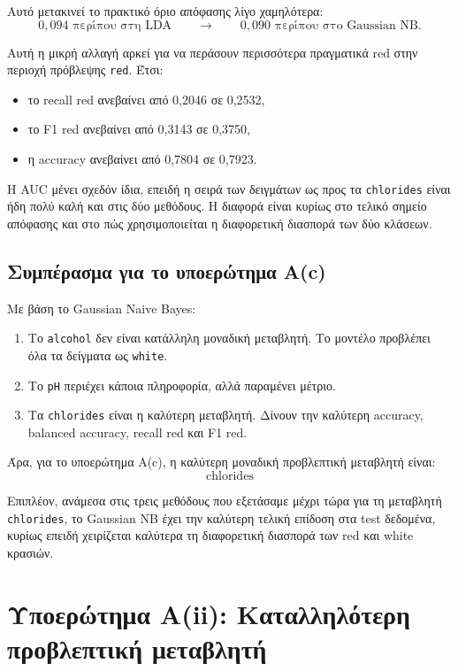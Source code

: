 \documentclass[11pt,a4paper]{article}
\newcommand{\code}[1]{\texttt{#1}}
\begin{document}
Αυτό μετακινεί το πρακτικό όριο απόφασης λίγο χαμηλότερα:
\[
0{,}094 \text{ περίπου στη LDA}
\qquad \rightarrow \qquad
0{,}090 \text{ περίπου στο Gaussian NB}.
\]

Αυτή η μικρή αλλαγή αρκεί για να περάσουν περισσότερα πραγματικά red στην
περιοχή πρόβλεψης \code{red}. Έτσι:
\begin{itemize}
    \item το recall red ανεβαίνει από 0,2046 σε 0,2532,
    \item το F1 red ανεβαίνει από 0,3143 σε 0,3750,
    \item η accuracy ανεβαίνει από 0,7804 σε 0,7923.
\end{itemize}

Η AUC μένει σχεδόν ίδια, επειδή η σειρά των δειγμάτων ως προς τα
\code{chlorides} είναι ήδη πολύ καλή και στις δύο μεθόδους. Η διαφορά είναι
κυρίως στο τελικό σημείο απόφασης και στο πώς χρησιμοποιείται η διαφορετική
διασπορά των δύο κλάσεων.

\subsection{Συμπέρασμα για το υποερώτημα Α(c)}

Με βάση το Gaussian Naive Bayes:
\begin{enumerate}
    \item Το \code{alcohol} δεν είναι κατάλληλη μοναδική μεταβλητή. Το μοντέλο
    προβλέπει όλα τα δείγματα ως \code{white}.

    \item Το \code{pH} περιέχει κάποια πληροφορία, αλλά παραμένει μέτριο.

    \item Τα \code{chlorides} είναι η καλύτερη μεταβλητή. Δίνουν την καλύτερη
    accuracy, balanced accuracy, recall red και F1 red.
\end{enumerate}

Άρα, για το υποερώτημα Α(c), η καλύτερη μοναδική προβλεπτική μεταβλητή είναι:
\[
\boxed{\text{chlorides}}
\]

Επιπλέον, ανάμεσα στις τρεις μεθόδους που εξετάσαμε μέχρι τώρα για τη
μεταβλητή \code{chlorides}, το Gaussian NB έχει την καλύτερη τελική επίδοση
στα test δεδομένα, κυρίως επειδή χειρίζεται καλύτερα τη διαφορετική διασπορά
των red και white κρασιών.

\section{Υποερώτημα Α(ii): Καταλληλότερη προβλεπτική μεταβλητή}
\end{document}

